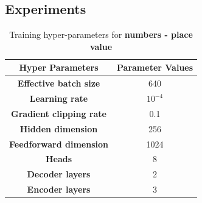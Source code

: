 \documentclass{article}
\begin{document}
\subsection{Experiments}
\begin{table}[ht]
\caption{Training hyper-parameters for \textbf{numbers - place value}}
\begin{center}
\begin{tabular}{cc} \toprule
   \textbf{Hyper Parameters} & \textbf{Parameter Values}\\ \midrule
    
    \textbf{Effective batch size} & 640\\ \midrule
    \textbf{Learning rate}  & $10^{-4}$ \\ \midrule
    \textbf{Gradient clipping rate}  & 0.1  \\ \midrule
    
    \textbf{Hidden dimension}  & 256  \\
    \textbf{Feedforward dimension}  & 1024  \\
    \textbf{Heads}  & 8  \\
    \textbf{Decoder layers}  & 2 \\
    \textbf{Encoder layers} & 3 \\\bottomrule
\end{tabular}
\end{center}
\end{table}
\end{document}
